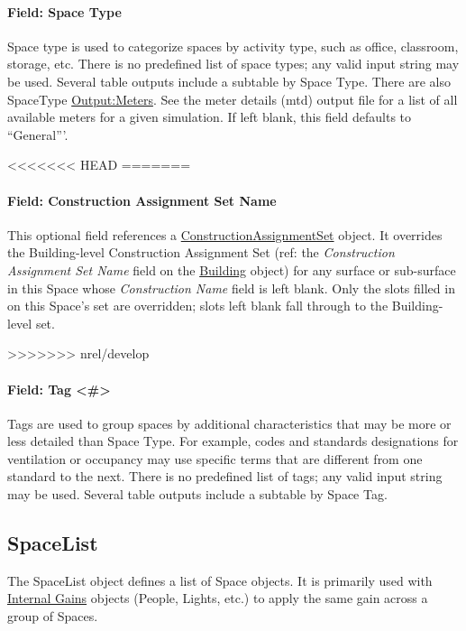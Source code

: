 \paragraph{Field: Space Type}\label{space-type}

Space type is used to categorize spaces by activity type, such as office, classroom, storage, etc. There is no predefined list of space types;
any valid input string may be used. Several table outputs include a subtable by Space Type. There are also SpaceType \hyperref[outputmeter-and-outputmetermeterfileonly]{Output:Meters}. See the meter details (mtd) output file for a list of all available meters for a given simulation.
If left blank, this field defaults to ``General'''.

<<<<<<< HEAD
=======
\paragraph{Field: Construction Assignment Set Name}\label{space-field-construction-assignment-set-name}

This optional field references a \hyperref[constructionassignmentset]{ConstructionAssignmentSet} object. It overrides the Building-level Construction Assignment Set (ref: the \emph{Construction Assignment Set Name} field on the \hyperref[building]{Building} object) for any surface or sub-surface in this Space whose \emph{Construction Name} field is left blank. Only the slots filled in on this Space's set are overridden; slots left blank fall through to the Building-level set.

>>>>>>> nrel/develop
\paragraph{Field: Tag \textless{}\#\textgreater{}}\label{field-space-tag}

Tags are used to group spaces by additional characteristics that may be more or less detailed than Space Type. For example, codes and standards designations for ventilation or occupancy may use specific terms that are different from one standard to the next. There is no predefined list of tags;
any valid input string may be used. Several table outputs include a subtable by Space Tag.


\subsection{SpaceList}\label{spacelist}

The SpaceList object defines a list of Space objects. It is primarily used with \hyperref[group-internal-gains-people-lights-other-internal-zone-equipment]{Internal Gains} objects (People, Lights, etc.) to apply the same gain across a group of Spaces.

